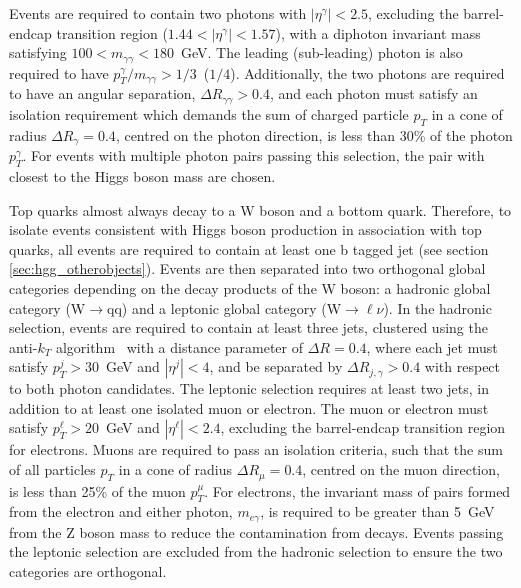 Events are required to contain two photons with $|\eta^\gamma|<2.5$, excluding the barrel-endcap transition region ($1.44<|\eta^\gamma|<1.57$), with a diphoton invariant mass satisfying ${100<m_{\gamma\gamma}<180}$~GeV. The leading (sub-leading) photon is also required to have $p^\gamma_T/m_{\gamma\gamma}>1/3$~($1/4$). Additionally, the two photons are required to have an angular separation, $\Delta R_{\gamma\gamma}>0.4$, and each photon must satisfy an isolation requirement which demands the sum of charged particle $p_T$ in a cone of radius $\Delta R_{\gamma}=0.4$, centred on the photon direction, is less than 30\% of the photon $p_T^\gamma$. For events with multiple photon pairs passing this selection, the pair with \mgg closest to the Higgs boson mass are chosen.

Top quarks almost always decay to a W boson and a bottom quark. Therefore, to isolate events consistent with Higgs boson production in association with top quarks, all events are required to contain at least one b tagged jet (see section \ref{sec:hgg_otherobjects}). Events are then separated into two orthogonal global categories depending on the decay products of the W boson: a hadronic global category (W$\rightarrow$qq) and a leptonic global category (W$\rightarrow\ell\nu$). In the hadronic selection, events are required to contain at least three jets, clustered using the anti-$k_T$ algorithm~\cite{Cacciari:2008gp,Cacciari:2011ma} with a distance parameter of $\Delta R=0.4$, where each jet must satisfy $p_T^j>30$~GeV and $|\eta^j|<4$, and be separated by $\Delta R_{j,\gamma}>0.4$ with respect to both photon candidates. The leptonic selection requires at least two jets, in addition to at least one isolated muon or electron. The muon or electron must satisfy $p_T^\ell>20$~GeV and $|\eta^\ell|<2.4$, excluding the barrel-endcap transition region for electrons. Muons are required to pass an isolation criteria, such that the sum of all particles $p_T$ in a cone of radius $\Delta R_{\mu}=0.4$, centred on the muon direction, is less than 25\% of the muon $p_T^\mu$. For electrons, the invariant mass of pairs formed from the electron and either photon, $m_{e\gamma}$, is required to be greater than 5~GeV from the Z boson mass to reduce the contamination from \Zee decays. Events passing the leptonic selection are excluded from the hadronic selection to ensure the two categories are orthogonal.

